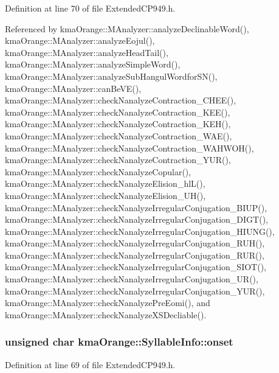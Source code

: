 Definition at line 70 of file ExtendedCP949.h.

Referenced by kmaOrange::MAnalyzer::analyzeDeclinableWord(), kmaOrange::MAnalyzer::analyzeEojul(), kmaOrange::MAnalyzer::analyzeHeadTail(), kmaOrange::MAnalyzer::analyzeSimpleWord(), kmaOrange::MAnalyzer::analyzeSubHangulWordforSN(), kmaOrange::MAnalyzer::canBeVE(), kmaOrange::MAnalyzer::checkNanalyzeContraction\_\-CHEE(), kmaOrange::MAnalyzer::checkNanalyzeContraction\_\-KEE(), kmaOrange::MAnalyzer::checkNanalyzeContraction\_\-KEH(), kmaOrange::MAnalyzer::checkNanalyzeContraction\_\-WAE(), kmaOrange::MAnalyzer::checkNanalyzeContraction\_\-WAHWOH(), kmaOrange::MAnalyzer::checkNanalyzeContraction\_\-YUR(), kmaOrange::MAnalyzer::checkNanalyzeCopular(), kmaOrange::MAnalyzer::checkNanalyzeElision\_\-hlL(), kmaOrange::MAnalyzer::checkNanalyzeElision\_\-UH(), kmaOrange::MAnalyzer::checkNanalyzeIrregularConjugation\_\-BIUP(), kmaOrange::MAnalyzer::checkNanalyzeIrregularConjugation\_\-DIGT(), kmaOrange::MAnalyzer::checkNanalyzeIrregularConjugation\_\-HIUNG(), kmaOrange::MAnalyzer::checkNanalyzeIrregularConjugation\_\-RUH(), kmaOrange::MAnalyzer::checkNanalyzeIrregularConjugation\_\-RUR(), kmaOrange::MAnalyzer::checkNanalyzeIrregularConjugation\_\-SIOT(), kmaOrange::MAnalyzer::checkNanalyzeIrregularConjugation\_\-UR(), kmaOrange::MAnalyzer::checkNanalyzeIrregularConjugation\_\-YUR(), kmaOrange::MAnalyzer::checkNanalyzePreEomi(), and kmaOrange::MAnalyzer::checkNanalyzeXSDecliable().\hypertarget{structkmaOrange_1_1SyllableInfo_e1fe1b8ac752b39844a547d628df0117}{
\subsubsection[{onset}]{\setlength{\rightskip}{0pt plus 5cm}unsigned char {\bf kmaOrange::SyllableInfo::onset}}}
\label{structkmaOrange_1_1SyllableInfo_e1fe1b8ac752b39844a547d628df0117}




Definition at line 69 of file ExtendedCP949.h.

